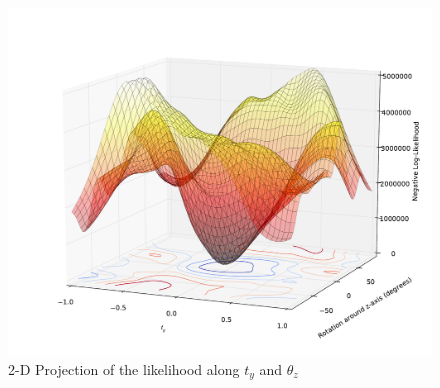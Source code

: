 \documentclass{article} %
\begin{document}
\begin{figure}[ht!]
\begin{center}
\includegraphics[width=6in]{LLmap3.pdf}
\end{center}
\caption{2-D Projection of the likelihood along $t_y$ and $\theta_z$}
\label{figure:likelihood}
\end{figure}
\end{document}
